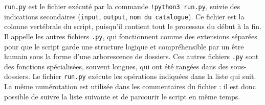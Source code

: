 \documentclass[a4paper,12pt,twoside]{book}
\begin{document}
\texttt{run.py} est le fichier exécuté par la commande \texttt{!python3 run.py}, suivie des indications secondaires (\texttt{input}, \texttt{output}, \texttt{nom du catalogue}). Ce fichier est la colonne vertébrale du script, puisqu'il contient tout le processus du début à la fin. Il appelle les autres fichiers \texttt{.py}, qui fonctionnent comme des extensions séparées pour que le script garde une structure logique et compréhensible par un être humain sous la forme d'une arborescence de dossiers. Ces autres fichiers \texttt{.py} sont des fonctions spécialisées, souvent longues, qui ont été rangées dans des sous-dossiers. Le fichier \texttt{run.py} exécute les opérations indiquées dans la liste qui suit. La même numérotation est utilisée dans les commentaires du fichier : il est donc possible de suivre la liste suivante et de parcourir le script en même temps.\\
\end{document}
